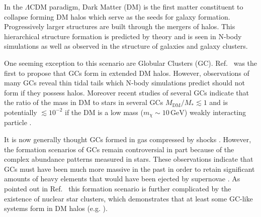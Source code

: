 \documentclass[aps,floatfix,prd,showpacs]{revtex4}
\newcommand{\mx}{m_\chi}
\newcommand{\MDM}{M_{\mathrm{DM}}}
\newcommand{\gev}{\textrm{GeV}}
\begin{document}
In the $\Lambda$CDM paradigm, Dark Matter (DM) is the first matter constituent to collapse forming DM halos which serve as the seeds for galaxy formation.  Progressively larger structures are built through the mergers of halos.  This hierarchical structure formation is predicted by theory and is seen in N-body simulations as well as observed in the structure of galaxies and galaxy clusters.  


One seeming exception to this scenario are Globular Clusters (GC).  Ref.~\cite{Peebles1984} was the first to propose that GCs form in extended DM halos.  However, observations of many GCs reveal thin tidal tails which N-body simulations predict should not form if they possess halos.  Moreover recent studies of several GCs indicate that the ratio of the mass in DM to stars in several GCs $\MDM/M_* \lesssim 1$ \cite{Grillmair1995,Odenkirchen2003,Moore1996,Shin, Conroy,Ibata2013} and is potentially $\lesssim 10^{-2}$ if the DM is a low mass ($\mx \sim 10\, \gev$) weakly interacting particle \cite{HurstWDGC}. 



It is now generally thought GCs formed in gas compressed by shocks \cite{Gunn1980,Harris1994}.  However, the formation scenarios of GCs remain controversial in part because of the complex abundance patterns measured in stars.  These observations indicate that GCs must have been much more massive in the past in order to retain significant amounts of heavy elements that would have been ejected by supernovae \cite{Gratton,Gratton2012,Con&Sperg}.  As pointed out in Ref.~\cite{Conroy} this formation scenario is further complicated by the existence of nuclear star clusters, which demonstrates that at least some GC-like systems form in DM halos (e.g. \cite{Taylor2015,Boker2004,Walcher2005,Walcher2006}).
\end{document}
